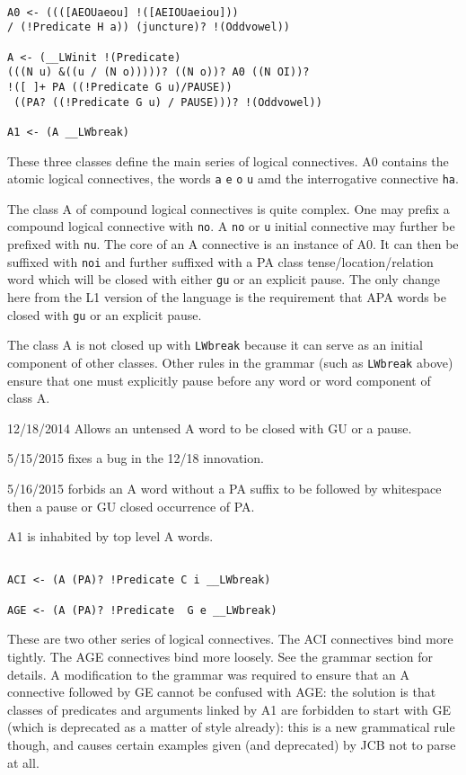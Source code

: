 \documentclass[12pt]{article}
\begin{document}
\begin{verbatim}

A0 <- ((([AEOUaeou] !([AEIOUaeiou])) 
/ (!Predicate H a)) (juncture)? !(Oddvowel))

A <- (__LWinit !(Predicate) 
(((N u) &((u / (N o)))))? ((N o))? A0 ((N OI))?
!([ ]+ PA ((!Predicate G u)/PAUSE))
 ((PA? ((!Predicate G u) / PAUSE)))? !(Oddvowel))

A1 <- (A __LWbreak)

\end{verbatim}

These three classes define the main series of logical connectives.  A0 contains the atomic logical connectives,
the words {\tt a} {\tt e}  {\tt o}  {\tt u} amd the interrogative connective {\tt ha}.

The class A of compound logical connectives is quite complex.  One may prefix a compound logical connective
with {\tt no}.  A {\tt no} or {\tt u} initial connective may further be prefixed with {\tt nu}.  The core of an A
connective is an instance of A0.  It can then be suffixed with {\tt noi} and further suffixed with a PA class tense/location/relation word which will be closed with either {\tt gu} or an explicit pause.  The only change
here from the L1 version of the language is the requirement that APA words be closed with {\tt gu} or an explicit pause.

The class A is not closed up with {\tt LWbreak}  because it can serve as an initial component of other classes.  Other rules
in the grammar (such as {\tt LWbreak} above) ensure that one must explicitly pause before any word or word component of class A.

12/18/2014  Allows an untensed A word to be closed with GU or a pause.

5/15/2015 fixes a bug in the 12/18 innovation.

5/16/2015 forbids an A word without a PA suffix to be followed by whitespace then a pause or GU closed occurrence of PA.

A1 is inhabited by top level A words.

\begin{verbatim}

ACI <- (A (PA)? !Predicate C i __LWbreak)

AGE <- (A (PA)? !Predicate  G e __LWbreak)

\end{verbatim}

These are two other series of logical connectives.  The ACI connectives bind more tightly.  The AGE connectives bind
more loosely.  See the grammar section for details.  A modification to the grammar was required to ensure that
an A connective followed by GE cannot be confused with AGE:  the solution is that classes of predicates and arguments
linked by A1 are forbidden to start with GE (which is deprecated as a matter of style already):  this is a new grammatical rule though, and causes certain examples given (and deprecated) by JCB not to parse at all.
\end{document}
